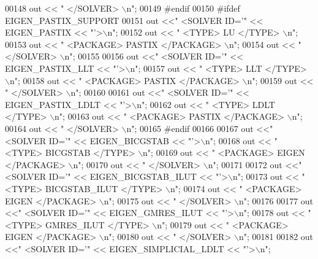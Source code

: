 \begin{DoxyCode}
00148   out << \textcolor{stringliteral}{"  </SOLVER> \(\backslash\)n"}; 
00149 \textcolor{preprocessor}{#endif}
00150 \textcolor{preprocessor}{#ifdef EIGEN\_PASTIX\_SUPPORT}
00151   out <<\textcolor{stringliteral}{"  <SOLVER ID='"} << EIGEN\_PASTIX << \textcolor{stringliteral}{"'>\(\backslash\)n"}; 
00152   out << \textcolor{stringliteral}{"   <TYPE> LU </TYPE> \(\backslash\)n"};
00153   out << \textcolor{stringliteral}{"   <PACKAGE> PASTIX </PACKAGE> \(\backslash\)n"}; 
00154   out << \textcolor{stringliteral}{"  </SOLVER> \(\backslash\)n"}; 
00155   
00156   out <<\textcolor{stringliteral}{"  <SOLVER ID='"} << EIGEN\_PASTIX\_LLT << \textcolor{stringliteral}{"'>\(\backslash\)n"}; 
00157   out << \textcolor{stringliteral}{"   <TYPE> LLT </TYPE> \(\backslash\)n"};
00158   out << \textcolor{stringliteral}{"   <PACKAGE> PASTIX </PACKAGE> \(\backslash\)n"}; 
00159   out << \textcolor{stringliteral}{"  </SOLVER> \(\backslash\)n"}; 
00160   
00161   out <<\textcolor{stringliteral}{"  <SOLVER ID='"} << EIGEN\_PASTIX\_LDLT << \textcolor{stringliteral}{"'>\(\backslash\)n"}; 
00162   out << \textcolor{stringliteral}{"   <TYPE> LDLT </TYPE> \(\backslash\)n"};
00163   out << \textcolor{stringliteral}{"   <PACKAGE> PASTIX </PACKAGE> \(\backslash\)n"}; 
00164   out << \textcolor{stringliteral}{"  </SOLVER> \(\backslash\)n"}; 
00165 \textcolor{preprocessor}{#endif}
00166   
00167   out <<\textcolor{stringliteral}{"  <SOLVER ID='"} << EIGEN\_BICGSTAB << \textcolor{stringliteral}{"'>\(\backslash\)n"}; 
00168   out << \textcolor{stringliteral}{"   <TYPE> BICGSTAB </TYPE> \(\backslash\)n"};
00169   out << \textcolor{stringliteral}{"   <PACKAGE> EIGEN </PACKAGE> \(\backslash\)n"}; 
00170   out << \textcolor{stringliteral}{"  </SOLVER> \(\backslash\)n"}; 
00171   
00172   out <<\textcolor{stringliteral}{"  <SOLVER ID='"} << EIGEN\_BICGSTAB\_ILUT << \textcolor{stringliteral}{"'>\(\backslash\)n"}; 
00173   out << \textcolor{stringliteral}{"   <TYPE> BICGSTAB\_ILUT </TYPE> \(\backslash\)n"};
00174   out << \textcolor{stringliteral}{"   <PACKAGE> EIGEN </PACKAGE> \(\backslash\)n"}; 
00175   out << \textcolor{stringliteral}{"  </SOLVER> \(\backslash\)n"}; 
00176   
00177   out <<\textcolor{stringliteral}{"  <SOLVER ID='"} << EIGEN\_GMRES\_ILUT << \textcolor{stringliteral}{"'>\(\backslash\)n"}; 
00178   out << \textcolor{stringliteral}{"   <TYPE> GMRES\_ILUT </TYPE> \(\backslash\)n"};
00179   out << \textcolor{stringliteral}{"   <PACKAGE> EIGEN </PACKAGE> \(\backslash\)n"}; 
00180   out << \textcolor{stringliteral}{"  </SOLVER> \(\backslash\)n"}; 
00181   
00182   out <<\textcolor{stringliteral}{"  <SOLVER ID='"} << EIGEN\_SIMPLICIAL\_LDLT << \textcolor{stringliteral}{"'>\(\backslash\)n"}; 

\end{DoxyCode}
